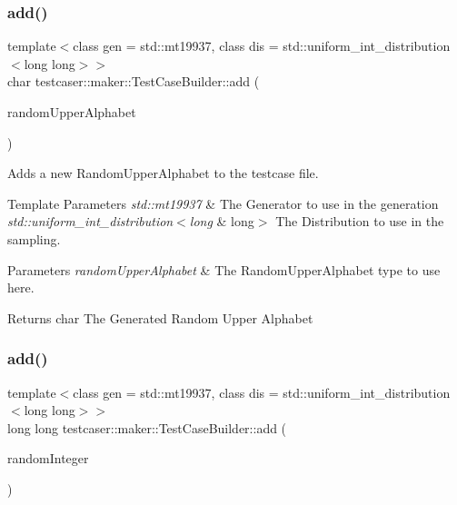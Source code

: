 \subsubsection{\texorpdfstring{add()}{add()}\hspace{0.1cm}{\footnotesize\ttfamily [3/11]}}
{\footnotesize\ttfamily template$<$class gen  = std\+::mt19937, class dis  = std\+::uniform\+\_\+int\+\_\+distribution$<$long long$>$$>$ \\
char testcaser\+::maker\+::\+Test\+Case\+Builder\+::add (\begin{DoxyParamCaption}\item[{\mbox{\hyperlink{classtestcaser_1_1maker_1_1types_1_1RandomUpperAlphabet}{types\+::\+Random\+Upper\+Alphabet}}$<$ gen, dis $>$ \&}]{random\+Upper\+Alphabet }\end{DoxyParamCaption})\hspace{0.3cm}{\ttfamily [inline]}}



Adds a new Random\+Upper\+Alphabet to the testcase file. 


\begin{DoxyTemplParams}{Template Parameters}
{\em std\+::mt19937} & The Generator to use in the generation \\
\hline
{\em std\+::uniform\+\_\+int\+\_\+distribution$<$long} & long$>$ The Distribution to use in the sampling. \\
\hline
\end{DoxyTemplParams}

\begin{DoxyParams}{Parameters}
{\em random\+Upper\+Alphabet} & The Random\+Upper\+Alphabet type to use here. \\
\hline
\end{DoxyParams}
\begin{DoxyReturn}{Returns}
char The Generated Random Upper Alphabet 
\end{DoxyReturn}
\mbox{\label{classtestcaser_1_1maker_1_1TestCaseBuilder_a2ef119caff9fb4bd1b313964af9e77e0}} 
\subsubsection{\texorpdfstring{add()}{add()}\hspace{0.1cm}{\footnotesize\ttfamily [4/11]}}
{\footnotesize\ttfamily template$<$class gen  = std\+::mt19937, class dis  = std\+::uniform\+\_\+int\+\_\+distribution$<$long long$>$$>$ \\
long long testcaser\+::maker\+::\+Test\+Case\+Builder\+::add (\begin{DoxyParamCaption}\item[{\mbox{\hyperlink{classtestcaser_1_1maker_1_1types_1_1RandomInteger}{types\+::\+Random\+Integer}}$<$ gen, dis $>$ \&}]{random\+Integer }\end{DoxyParamCaption})\hspace{0.3cm}{\ttfamily [inline]}}



